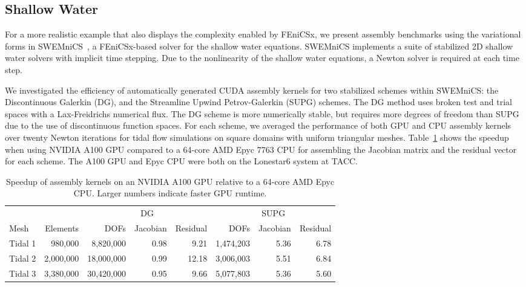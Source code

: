 \subsection*{Shallow Water}
For a more realistic example that also displays the complexity enabled by FEniCSx, we present assembly benchmarks using the variational forms in SWEMniCS~\citep{dawson2024swemnics}, a FEniCSx-based solver for the shallow water equations. SWEMniCS implements a suite of stabilized 2D shallow water solvers with implicit time stepping. Due to the nonlinearity of the shallow water equations, a Newton solver is required at each time step.

We investigated the efficiency of automatically generated CUDA assembly kernels for two stabilized schemes within SWEMniCS: the Discontinuous Galerkin (DG), and the Streamline Upwind Petrov-Galerkin (SUPG) schemes. The DG method uses broken test and trial spaces with a Lax-Freidrichs numerical flux. The DG scheme is more numerically stable, but requires more degrees of freedom than SUPG due to the use of discontinuous function spaces. For each scheme, we averaged the performance of both GPU and CPU assembly kernels over twenty Newton iterations for tidal flow simulations on square domains with uniform triangular meshes. Table~\ref{tab:swe_a100_vs_epyc} shows the speedup when using NVIDIA A100 GPU compared to a 64-core AMD Epyc 7763 CPU for assembling the Jacobian matrix and the residual vector for each scheme. The A100 GPU and Epyc CPU were both on the Lonestar6 system at TACC.
\begin{table}[t]
    \centering
    \begin{tabular}{lrrrrrrr}
\toprule
        &           &           \multicolumn{3}{c}{DG} & \multicolumn{3}{c}{SUPG} \\
                                  \cmidrule(lr){3-5}       \cmidrule(lr){6-8}
Mesh    &  Elements &  DOFs & Jacobian & Residual  & DOFs  & Jacobian & Residual \\
\midrule
Tidal 1 &   980,000 &  8,820,000 &     0.98 &      9.21 &  1,474,203 &   5.36 &     6.78 \\
Tidal 2 & 2,000,000 & 18,000,000 &     0.99 &     12.18 &  3,006,003 &   5.51 &     6.84 \\
Tidal 3 & 3,380,000 & 30,420,000 &     0.95 &      9.66 &  5,077,803 &   5.36 &     5.60 \\
\bottomrule
\end{tabular}
    \caption{Speedup of assembly kernels on an NVIDIA A100 GPU relative to a 64-core AMD Epyc CPU. Larger numbers indicate faster GPU runtime.}
    \label{tab:swe_a100_vs_epyc}
\end{table}

